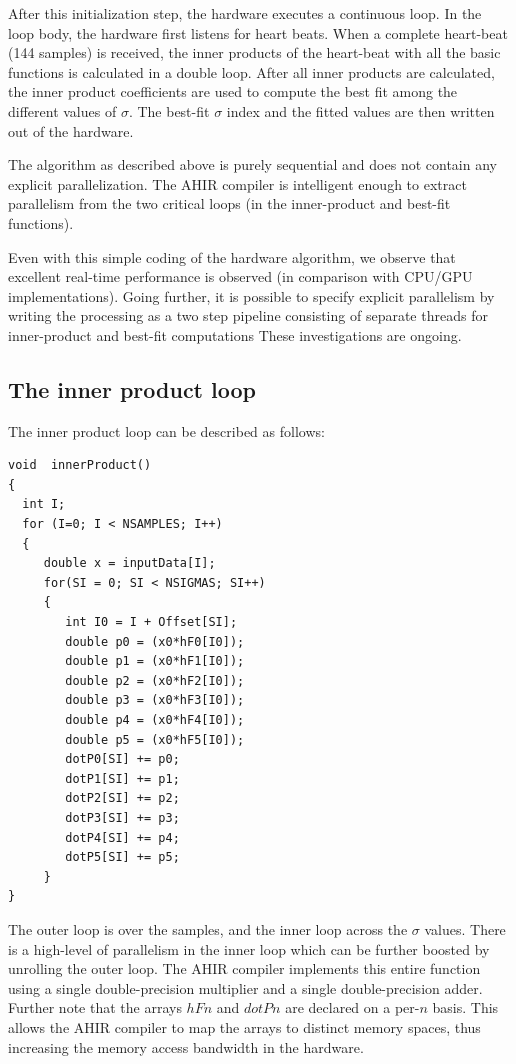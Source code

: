 \documentclass[runningheads]{llncs}
\begin{document}
After this initialization step, the hardware executes a continuous loop.  
In the loop body, the hardware first listens for heart beats. When
a complete heart-beat (144 samples) is received, the inner products of the
heart-beat with all the basic functions is calculated in a double loop.  
After all inner products are calculated, the inner product coefficients
are used to compute the best fit among the different values of $\sigma$.
The best-fit $\sigma$ index and the fitted values are then written
out of the hardware.

The algorithm as described above is purely sequential
and does not contain any explicit parallelization.  The AHIR compiler
is intelligent enough to extract parallelism from the two critical
loops (in the inner-product and best-fit functions).

Even with this simple coding of the hardware algorithm,
we observe that excellent real-time performance
is observed (in comparison with CPU/GPU implementations).
Going further, it is possible to specify explicit parallelism by
writing the processing as a two step pipeline consisting
of separate threads for inner-product and best-fit
computations  These investigations are ongoing.



\subsection{The inner product loop} \label{sec:InnerProduct}

The inner product loop can be described as follows:
\begin{verbatim}
void  innerProduct()
{
  int I;
  for (I=0; I < NSAMPLES; I++)
  {
     double x = inputData[I];
     for(SI = 0; SI < NSIGMAS; SI++)
     {
        int I0 = I + Offset[SI];
        double p0 = (x0*hF0[I0]);
        double p1 = (x0*hF1[I0]);
        double p2 = (x0*hF2[I0]);
        double p3 = (x0*hF3[I0]);
        double p4 = (x0*hF4[I0]);
        double p5 = (x0*hF5[I0]);
        dotP0[SI] += p0;
        dotP1[SI] += p1;
        dotP2[SI] += p2;
        dotP3[SI] += p3;
        dotP4[SI] += p4;
        dotP5[SI] += p5;
     }
}
\end{verbatim}
The outer loop is over the samples, and the inner
loop across the $\sigma$ values.  There is a high-level
of parallelism in the inner loop which can be further
boosted by unrolling the outer loop.   The AHIR compiler
implements this entire function using a single double-precision
multiplier and a single double-precision adder.  Further
note that the arrays $hFn$ and $dotPn$ are declared on
a per-$n$ basis. This allows the AHIR compiler to
map the arrays to distinct memory spaces, thus increasing
the memory access bandwidth in the hardware.
\end{document}

